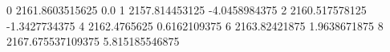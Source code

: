 0 2161.8603515625 0.0
1 2157.814453125 -4.0458984375
2 2160.517578125 -1.3427734375
4 2162.4765625 0.6162109375
6 2163.82421875 1.9638671875
8 2167.675537109375 5.815185546875
